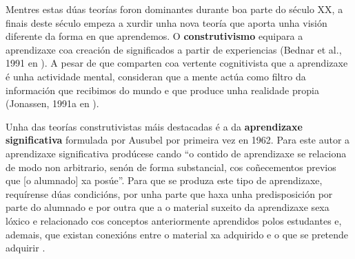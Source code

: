 Mentres estas dúas teorías foron dominantes durante boa parte do século XX, a finais deste século empeza a xurdir unha nova teoría que aporta unha visión diferente da forma en que aprendemos. O \textbf{construtivismo} equipara a aprendizaxe coa creación de significados a partir de experiencias (Bednar et al., 1991 en ). A pesar de que comparten coa vertente cognitivista que a aprendizaxe é unha actividade mental, consideran que a mente actúa como filtro da información que recibimos do mundo e que produce unha realidade propia (Jonassen, 1991a en ).

Unha das teorías construtivistas máis destacadas é a da \textbf{aprendizaxe significativa} formulada por Ausubel por primeira vez en 1962. Para este autor a aprendizaxe significativa prodúcese cando ``o contido de aprendizaxe se relaciona de modo non arbitrario, senón de forma substancial, cos coñecementos previos que [o alumnado] xa posúe''\cite[p.~206]{unedpsicoedu}. Para que se produza este tipo de aprendizaxe, requírense dúas condicións, por unha parte que haxa unha predisposición por parte do alumnado e por outra que a o material suxeito da aprendizaxe sexa lóxico e relacionado cos conceptos anteriormente aprendidos polos estudantes e, ademais, que existan conexións entre o material xa adquirido e o que se pretende adquirir \cite{rodriguez2004teoria}.
